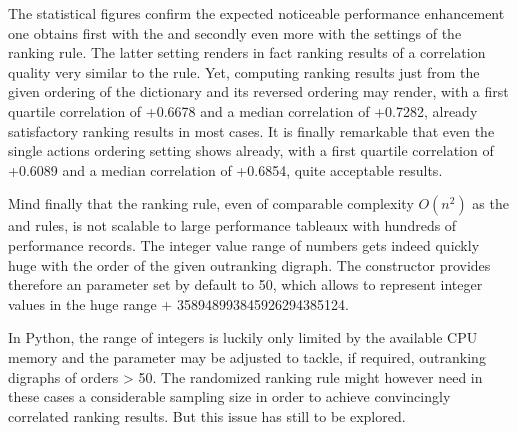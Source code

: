 \documentclass[a4paper,12pt,english]{sphinxhowto}
\begin{document}
\sphinxAtStartPar
The statistical figures confirm the expected noticeable performance enhancement one obtains first with the  and secondly even more with the  settings of the  ranking rule. The latter setting renders in fact ranking results of a correlation quality very similar to the  rule. Yet, computing ranking results just from the given ordering of the  dictionary and its reversed ordering may render, with a first quartile correlation of +0.6678 and a median correlation of +0.7282, already satisfactory ranking results in most cases. It is finally remarkable that even the single actions ordering setting shows already, with a first quartile correlation of +0.6089 and a median correlation of +0.6854, quite acceptable results.

\sphinxAtStartPar
Mind finally that the  ranking rule, even of comparable complexity \(O(n^2)\) as the  and  rules, is not scalable to large performance tableaux with hundreds of performance records. The integer value range of  numbers gets indeed quickly huge with the order of the given outranking digraph. The  constructor provides therefore an  parameter set by default to 50, which allows to represent integer values in the huge range +\sphinxhyphen{} 358948993845926294385124.

\begin{sphinxVerbatim}[commandchars=\\\{\},numbers=left,firstnumber=1,stepnumber=1]
  \PYG{p}{[}    \PYG{p}{]}
  
\end{sphinxVerbatim}

\sphinxAtStartPar
In Python, the range of integers is luckily only limited by the available CPU memory and the  parameter may be adjusted to tackle, if required, outranking digraphs of orders \textgreater{} 50. The randomized  ranking rule might however need in these cases a considerable sampling size in order to achieve convincingly correlated ranking results. But this issue has still to be explored.
\end{document}
